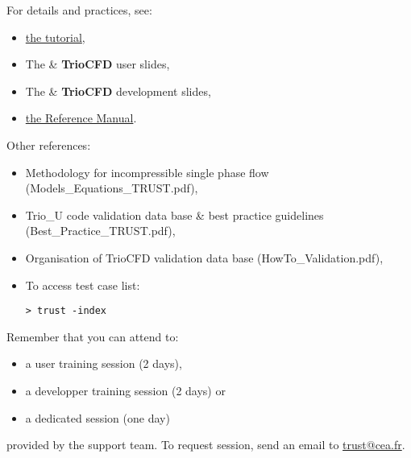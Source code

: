For details and practices, see:
\begin{itemize}
\item \href{TRUST_tutorial.pdf}{the \trust tutorial},
\item The \trust \& \textbf{TrioCFD} user slides,
\item The \trust \& \textbf{TrioCFD} development slides,
\item \href{\REFERENCEMANUAL}{the \trustref Reference Manual}.
\end{itemize}

Other references:
\begin{itemize}
\item Methodology for incompressible single phase flow (Models\_Equations\_TRUST.pdf),
\item Trio\_U code validation data base \& best practice guidelines (Best\_Practice\_TRUST.pdf),
\item Organisation of TrioCFD validation data base (HowTo\_Validation.pdf),
\item To access \trust test case list:
\begin{verbatim}
> trust -index
\end{verbatim}
\end{itemize}
\vspace{0.5cm}


Remember that you can attend to:
\begin{itemize}
\item a user training session (2 days),
\item a developper training session (2 days) or 
\item a dedicated session (one day)
\end{itemize}
provided by the support team.
To request session, send an email to \href{mailto:trust@cea.fr}{trust@cea.fr}.

